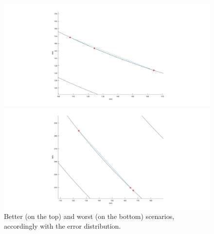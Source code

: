 \clearpage %
  \begin{figure}[t!]
    \centering
    \begin{minipage}[c]{\textwidth}
      \centering
      \includegraphics[width=\textwidth]{./images/diameter/c1_better.jpg}
    \end{minipage}
    \vfill
    \begin{minipage}[c]{\textwidth}
      \centering
      \includegraphics[width=\textwidth]{./images/diameter/c1_worst.jpg}
    \end{minipage}
    
    \caption{Better (on the top) and worst (on the bottom) scenarios, accordingly with the error distribution.}
    \label{fig:diam:scenarios}
  \end{figure}
\clearpage %
